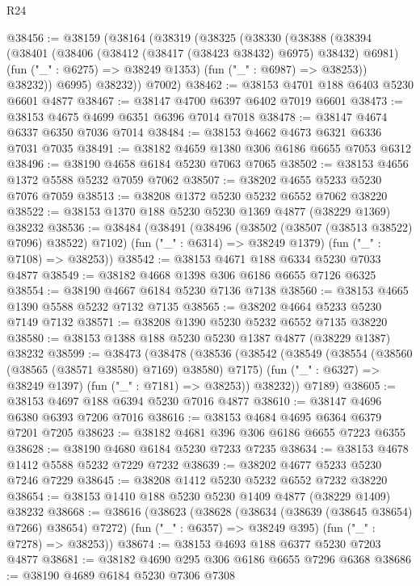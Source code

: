 \begin{lexlean}{R24}
\begin{coremodule}
@38456 := @38159
    (@38164
      (@38319
        (@38325
          (@38330
            (@38388
              (@38394
                (@38401
                  (@38406 (@38412 (@38417 (@38423 @38432) @6975) @38432) @6981)
                  (fun ("_" : @6275) => @38249 @1353)
                  (fun ("_" : @6987) => @38253))
                @38232))
            @6995)
          @38232))
      @7002)
@38462 := @38153 @4701 @188 @6403 @5230 @6601 @4877
@38467 := @38147 @4700 @6397 @6402 @7019 @6601
@38473 := @38153 @4675 @4699 @6351 @6396 @7014 @7018
@38478 := @38147 @4674 @6337 @6350 @7036 @7014
@38484 := @38153 @4662 @4673 @6321 @6336 @7031 @7035
@38491 := @38182 @4659 @1380 @306 @6186 @6655 @7053 @6312
@38496 := @38190 @4658 @6184 @5230 @7063 @7065
@38502 := @38153 @4656 @1372 @5588 @5232 @7059 @7062
@38507 := @38202 @4655 @5233 @5230 @7076 @7059
@38513 := @38208 @1372 @5230 @5232 @6552 @7062 @38220
@38522 := @38153 @1370 @188 @5230 @5230 @1369 @4877 (@38229 @1369) @38232
@38536 := @38484
    (@38491
      (@38496 (@38502 (@38507 (@38513 @38522) @7096) @38522) @7102)
      (fun ("_" : @6314) => @38249 @1379)
      (fun ("_" : @7108) => @38253))
@38542 := @38153 @4671 @188 @6334 @5230 @7033 @4877
@38549 := @38182 @4668 @1398 @306 @6186 @6655 @7126 @6325
@38554 := @38190 @4667 @6184 @5230 @7136 @7138
@38560 := @38153 @4665 @1390 @5588 @5232 @7132 @7135
@38565 := @38202 @4664 @5233 @5230 @7149 @7132
@38571 := @38208 @1390 @5230 @5232 @6552 @7135 @38220
@38580 := @38153 @1388 @188 @5230 @5230 @1387 @4877 (@38229 @1387) @38232
@38599 := @38473
    (@38478
      (@38536
        (@38542
          (@38549
            (@38554 (@38560 (@38565 (@38571 @38580) @7169) @38580) @7175)
            (fun ("_" : @6327) => @38249 @1397)
            (fun ("_" : @7181) => @38253))
          @38232))
      @7189)
@38605 := @38153 @4697 @188 @6394 @5230 @7016 @4877
@38610 := @38147 @4696 @6380 @6393 @7206 @7016
@38616 := @38153 @4684 @4695 @6364 @6379 @7201 @7205
@38623 := @38182 @4681 @396 @306 @6186 @6655 @7223 @6355
@38628 := @38190 @4680 @6184 @5230 @7233 @7235
@38634 := @38153 @4678 @1412 @5588 @5232 @7229 @7232
@38639 := @38202 @4677 @5233 @5230 @7246 @7229
@38645 := @38208 @1412 @5230 @5232 @6552 @7232 @38220
@38654 := @38153 @1410 @188 @5230 @5230 @1409 @4877 (@38229 @1409) @38232
@38668 := @38616
    (@38623
      (@38628 (@38634 (@38639 (@38645 @38654) @7266) @38654) @7272)
      (fun ("_" : @6357) => @38249 @395)
      (fun ("_" : @7278) => @38253))
@38674 := @38153 @4693 @188 @6377 @5230 @7203 @4877
@38681 := @38182 @4690 @295 @306 @6186 @6655 @7296 @6368
@38686 := @38190 @4689 @6184 @5230 @7306 @7308

\end{coremodule}
\end{lexlean}
